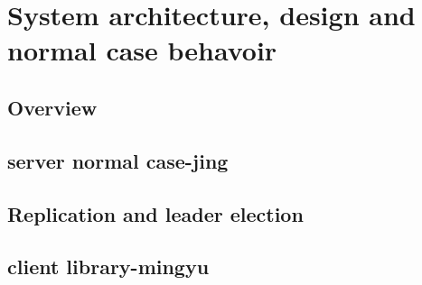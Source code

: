 \section{System architecture, design and normal case behavoir}
\subsection{Overview}


\subsection{server normal case-jing}

\subsection{Replication and leader election}


\subsection{client library-mingyu}
